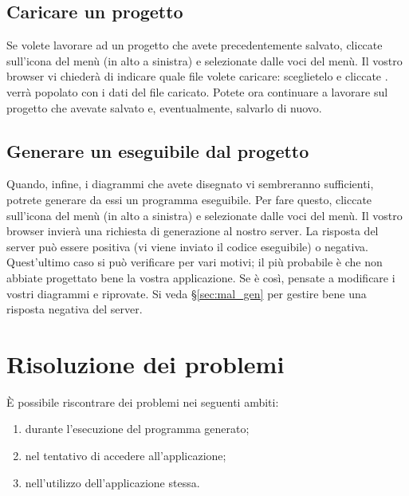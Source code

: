 \subsection{Caricare un progetto} \label{sec:load}

Se volete lavorare ad un progetto che avete precedentemente salvato, cliccate sull'icona del menù (in alto a sinistra) e selezionate  dalle voci del menù. Il vostro browser vi chiederà di indicare quale file volete caricare: sceglietelo e cliccate . \proj{} verrà popolato con i dati del file caricato. Potete ora continuare a lavorare sul progetto che avevate salvato e, eventualmente, salvarlo di nuovo.



\subsection{Generare un eseguibile dal progetto} \label{sec:gen}

Quando, infine, i diagrammi che avete disegnato vi sembreranno sufficienti, potrete generare da essi un programma eseguibile. Per fare questo, cliccate sull'icona del menù (in alto a sinistra) e selezionate  dalle voci del menù. Il vostro browser invierà una richiesta di generazione al nostro server. La risposta del server può essere positiva (vi viene inviato il codice eseguibile) o negativa. Quest'ultimo caso si può verificare per vari motivi; il più probabile è che non abbiate progettato bene la vostra applicazione. Se è così, pensate a modificare i vostri diagrammi e riprovate. Si veda §\ref{sec:mal_gen} per gestire bene una risposta negativa del server.






\section{Risoluzione dei problemi} \label{sec:problemi}

È possibile riscontrare dei problemi nei seguenti ambiti:
\begin{enumerate}
	\item durante l'esecuzione del programma generato;
	\item nel tentativo di accedere all'applicazione;
	\item nell'utilizzo dell'applicazione stessa.
\end{enumerate}



